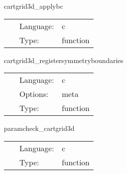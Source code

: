 \documentclass{article}
\begin{document}
\vspace{5mm}


\hspace{5mm} cartgrid3d\_applybc 

\hspace{5mm}{\it apply symmetry boundary conditions } 


\hspace{5mm}

 \begin{tabular*}{160mm}{cll} 
~ & Language:  & c \\ 
~ & Type:  & function \\ 
\end{tabular*} 


\vspace{5mm}


\hspace{5mm} cartgrid3d\_registersymmetryboundaries 

\hspace{5mm}{\it register symmetry boundaries } 


\hspace{5mm}

 \begin{tabular*}{160mm}{cll} 
~ & Language:  & c \\ 
~ & Options:  & meta \\ 
~ & Type:  & function \\ 
\end{tabular*} 


\vspace{5mm}


\hspace{5mm} paramcheck\_cartgrid3d 

\hspace{5mm}{\it check coordinates for cartgrid3d } 


\hspace{5mm}

 \begin{tabular*}{160mm}{cll} 
~ & Language:  & c \\ 
~ & Type:  & function \\ 
\end{tabular*} 


\vspace{5mm}
\end{document}
